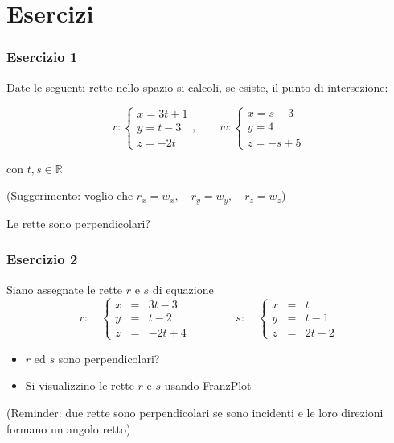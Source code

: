 \documentclass{beamer}
\newcommand{\frnzplt}{FranzPlot }
\begin{document}
\section{Esercizi}
\begin{frame}
    \frametitle{Esercizio 1}

Date le seguenti rette nello spazio si calcoli, se esiste, il punto di intersezione:

$$
r:\left\{
\begin{array}{l}
x=3t+1\\
y=t-3\\
z= -2t
\end{array}
\right ., \qquad w:\left\{
\begin{array}{l}
x=s+3\\
y=4\\
z=-s+5
\end{array}
\right .
$$

    con $t, s \in \mathbb R$

    (Suggerimento: voglio che $r_x = w_x, \quad r_y = w_y, \quad r_z = w_z$)
    
    \vspace{1cm}
    Le rette sono perpendicolari?

    \end{frame}
    

\begin{frame}
\frametitle{Esercizio 2}

Siano assegnate le rette $r$ e $s$ di equazione
$$
r: \quad \left\{
\begin{array}{lcr}
x&=&3t-3\\
y&=&t-2\\
    z&=&-2t+4
\end{array}
\right. \qquad \qquad s: \quad \left\{
\begin{array}{lcr}
x&=&t\\
y&=&t-1\\
z&=&2t-2
\end{array}
\right.
$$

    \begin{itemize}
    \item $r$ ed $s$ sono perpendicolari? 
    \item Si visualizzino le rette $r$ e $s$ usando \frnzplt
    \end{itemize}
    
    \vspace{0.75cm}
    (Reminder: due rette sono perpendicolari se sono incidenti e le loro direzioni formano un angolo retto)
\end{frame}
\end{document}
